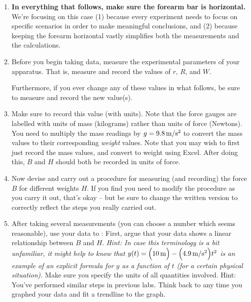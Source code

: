 \begin{enumerate}[series=labproc,label={\bf \arabic*.},
		ref=\textcolor{black}{\arabic*}]

\item
{\bf In everything that follows, make sure the forearm bar is horizontal.}
We're focusing on this case 
(1) because every experiment needs to focus on specific scenarios in order to 
make meaningful conclusions,
and (2) because keeping the forearm horizontal vastly simplifies both the
measurements and the calculations.

\item 
Before you begin taking data,
measure the experimental parameters of your apparatus.
That is, measure and record the values of $r$, $R$, and $W$.

Furthermore, if you ever change any of these values in what follows,
be sure to measure and record the new value(s).  


\item
{}
Make sure to record this value (with units).
Note that the force gauges are labelled with units of mass (kilograms) rather
than units of force (Newtons).  
You need to multiply the mass readings by $g=9.8\,\mathrm{m/s^2}$ 
to convert the mass values to
their corresponding \emph{weight} values.  Note that you may wish to first just
record the mass values, and convert to weight using Excel.
After doing this, $B$ and $H$ should both be recorded in units of force.

\item
Now devise and carry out a procedure for measuring (and recording)
the force $B$ for different weights $H$.  
If you find you need to modify the procedure as you carry it out,
that's okay -- but be sure to change the written version to correctly
reflect the steps you really carried out.

\item
After taking several measurements (you can choose a number which seems
reasonable), use your data to 
:
First, argue that your data shows a linear relationship between $B$ and $H$.
\emph{Hint:  In case this terminology is a bit unfamiliar, 
it might help to know that
$y(t) = \Bigl( 10\,\mathrm{m} \Bigr) -\Bigl( 4.9\,\mathrm{m/s^2} \Bigr)t^2$ 
is an example of an explicit formula 
for $y$ as a function of $t$ (for a certain physical situation).}
Make sure you specify the units of all quantities involved.
Hint:  You've performed similar steps in previous labs.
Think back to any time you graphed your data 
and fit a trendline to the graph.


\end{enumerate}
